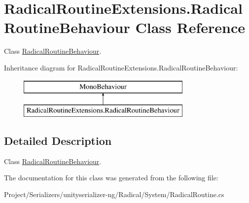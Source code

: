 \hypertarget{class_radical_routine_extensions_1_1_radical_routine_behaviour}{}\section{Radical\+Routine\+Extensions.\+Radical\+Routine\+Behaviour Class Reference}
\label{class_radical_routine_extensions_1_1_radical_routine_behaviour}


Class \hyperlink{class_radical_routine_extensions_1_1_radical_routine_behaviour}{Radical\+Routine\+Behaviour}.  


Inheritance diagram for Radical\+Routine\+Extensions.\+Radical\+Routine\+Behaviour\+:\begin{figure}[H]
\begin{center}
\leavevmode
\includegraphics[height=2.000000cm]{class_radical_routine_extensions_1_1_radical_routine_behaviour}
\end{center}
\end{figure}


\subsection{Detailed Description}
Class \hyperlink{class_radical_routine_extensions_1_1_radical_routine_behaviour}{Radical\+Routine\+Behaviour}. 



The documentation for this class was generated from the following file\+:\begin{DoxyCompactItemize}
\item 
Project/\+Serializers/unityserializer-\/ng/\+Radical/\+System/Radical\+Routine.\+cs\end{DoxyCompactItemize}
